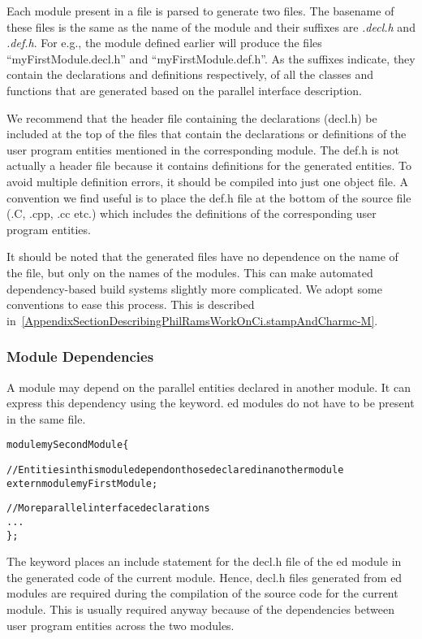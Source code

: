 Each module present in a \ci file is parsed to generate two files. The basename
of these files is the same as the name of the module and their suffixes are
\emph{.decl.h} and \emph{.def.h}. For e.g., the module defined earlier will
produce the files ``myFirstModule.decl.h'' and ``myFirstModule.def.h''. As the
suffixes indicate, they contain the declarations and definitions respectively,
of all the classes and functions that are generated based on the parallel
interface description.

We recommend that the header file containing the declarations (decl.h) be
included at the top of the files that contain the declarations or definitions
of the user program entities mentioned in the corresponding module. The def.h
is not actually a header file because it contains definitions for the generated
entities. To avoid multiple definition errors, it should be compiled into just
one object file. A convention we find useful is to place the def.h file at the
bottom of the source file (.C, .cpp, .cc etc.) which includes the definitions
of the corresponding user program entities.

\experimental
It should be noted that the generated files have no dependence on the name of the \ci
file, but only on the names of the modules. This can make automated dependency-based
build systems slightly more complicated. We adopt some conventions to ease this process.
This is described in~\ref{AppendixSectionDescribingPhilRamsWorkOnCi.stampAndCharmc-M}.


\subsubsection{Module Dependencies}

A module may depend on the parallel entities declared in another module. It can
express this dependency using the  keyword. ed modules
do not have to be present in the same \ci file.

\begin{alltt}
module mySecondModule \{

    // Entities in this module depend on those declared in another module
    extern module myFirstModule;

    // More parallel interface declarations
    ...
\};
\end{alltt}

The  keyword places an include statement for the decl.h file of the
ed module in the generated code of the current module. Hence,
decl.h files generated from ed modules are required during the
compilation of the source code for the current module. This is usually required
anyway because of the dependencies between user program entities across the two
modules.

